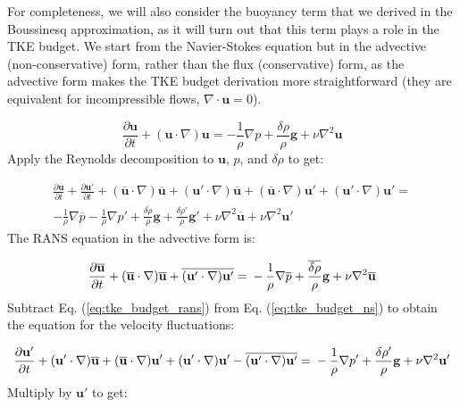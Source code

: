 \documentclass[12pt]{article}
\numberwithin{equation}{section}
\numberwithin{figure}{section}
\numberwithin{table}{section}
\begin{document}
For completeness, we will also consider the buoyancy term that we derived in
the Boussinesq approximation, as it will turn out that this term plays a role
in the TKE budget.
We start from the Navier-Stokes equation but in the advective (non-conservative)
form, rather than the flux (conservative) form, as the advective form makes the
TKE budget derivation more straightforward (they are equivalent for
incompressible flows, $\nabla \cdot \mathbf{u} = 0$).

\begin{equation}
  \frac{\partial \mathbf{u}}{\partial t} + 
  (\mathbf{u} \cdot \nabla) \mathbf{u} =
  - \frac{1}{\rho} \nabla p
  + \frac{\delta \rho}{\rho} \mathbf{g}
  + \nu \nabla^2 \mathbf{u}
\end{equation}
Apply the Reynolds decomposition to $\mathbf{u}$, $p$, and $\delta \rho$ to get:

\begin{equation}
  \begin{split}
  \frac{\partial \overline{\mathbf{u}}}{\partial t} + \frac{\partial \mathbf{u}'}{\partial t} +
  (\overline{\mathbf{u}} \cdot \nabla) \overline{\mathbf{u}} +
  (\mathbf{u}' \cdot \nabla) \overline{\mathbf{u}} +
  (\overline{\mathbf{u}} \cdot \nabla) \mathbf{u}' +
  (\mathbf{u}' \cdot \nabla) \mathbf{u}' = \\
  - \frac{1}{\rho} \nabla \overline{p}
  - \frac{1}{\rho} \nabla p'
  + \frac{\overline{\delta \rho}}{\rho} \mathbf{g}
  + \frac{\delta \rho'}{\rho} \mathbf{g}'
  + \nu \nabla^2 \overline{\mathbf{u}}
  + \nu \nabla^2 \mathbf{u}'
  \end{split}
  \label{eq:tke_budget_ns}
\end{equation}
The RANS equation in the advective form is:

\begin{equation}
  \frac{\partial \overline{\mathbf{u}}}{\partial t} +
  (\overline{\mathbf{u}} \cdot \nabla) \overline{\mathbf{u}} +
  \overline{(\mathbf{u}' \cdot \nabla) \mathbf{u}'} = \\
  - \frac{1}{\rho} \nabla \overline{p}
  + \frac{\overline{\delta \rho}}{\rho} \mathbf{g}
  + \nu \nabla^2 \overline{\mathbf{u}}
  \label{eq:tke_budget_rans}
\end{equation}
Subtract Eq. (\ref{eq:tke_budget_rans}) from Eq. (\ref{eq:tke_budget_ns}) to
obtain the equation for the velocity fluctuations:

\begin{equation}
  \frac{\partial \mathbf{u}'}{\partial t} +
  (\mathbf{u}' \cdot \nabla) \overline{\mathbf{u}} +
  (\overline{\mathbf{u}} \cdot \nabla) \mathbf{u}' +
  (\mathbf{u}' \cdot \nabla) \mathbf{u}' -
  \overline{(\mathbf{u}' \cdot \nabla) \mathbf{u}'} = \\
  - \frac{1}{\rho} \nabla p'
  + \frac{\delta \rho'}{\rho} \mathbf{g}
  + \nu \nabla^2 \mathbf{u}'
\end{equation}
Multiply by $\mathbf{u}'$ to get:
\end{document}
